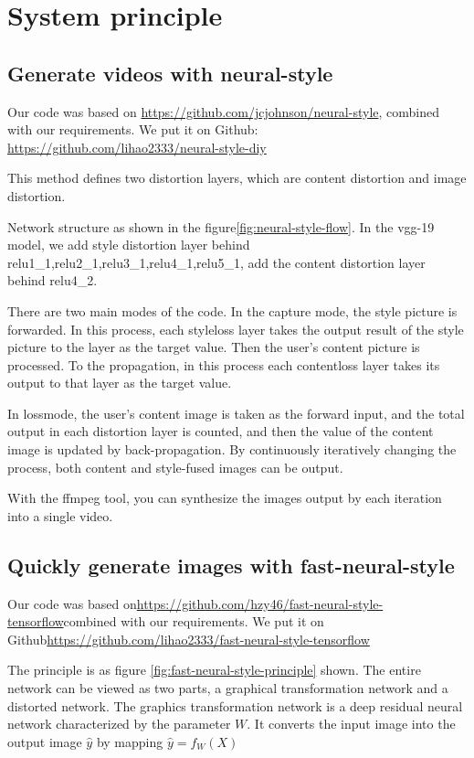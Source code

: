 \section{System principle}
\subsection{Generate videos with neural-style}
Our code was based on \url{https://github.com/jcjohnson/neural-style}, combined with our requirements. We put it on Github: \url{https://github.com/lihao2333/neural-style-diy}

This method defines two distortion layers, which are content distortion and image distortion.

Network structure as shown in the figure\ref{fig:neural-style-flow}. In the vgg-19 model, we add style distortion layer behind relu1\_1,relu2\_1,relu3\_1,relu4\_1,relu5\_1, add the content distortion layer behind relu4\_2.

There are two main modes of the code. In the capture mode, the style picture is forwarded. In this process, each styleloss layer takes the output result of the style picture to the layer as the target value. Then the user's content picture is processed. To the propagation, in this process each contentloss layer takes its output to that layer as the target value.

In lossmode, the user's content image is taken as the forward input, and the total output in each distortion layer is counted, and then the value of the content image is updated by back-propagation. By continuously iteratively changing the process, both content and style-fused images can be output.

With the ffmpeg tool, you can synthesize the images output by each iteration into a single video.
\subsection{Quickly generate images with fast-neural-style}
Our code was based on\url{https://github.com/hzy46/fast-neural-style-tensorflow}combined with our requirements. We put it on Github\url{https://github.com/lihao2333/fast-neural-style-tensorflow}

The principle is as figure \ref{fig:fast-neural-style-principle} shown.
The entire network can be viewed as two parts, a graphical transformation network and a distorted network.
The graphics transformation network is a deep residual neural network characterized by the parameter $W$. It converts the input image into the output image $\hat y$ by mapping $\hat y=f_W(X)$

